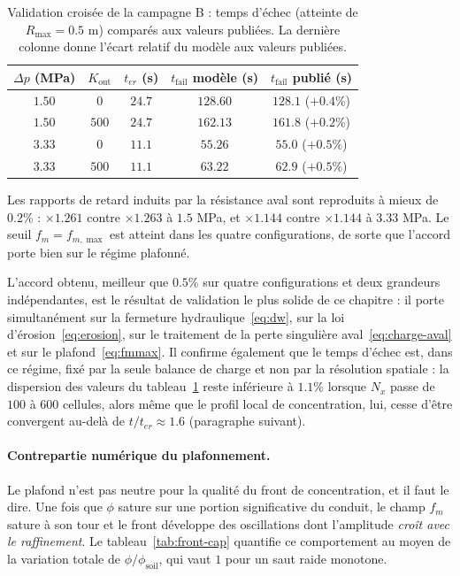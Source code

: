 \documentclass[11pt,a4paper]{report}
\newcommand{\phisol}{\phi_{\mathrm{soil}}}
\newcommand{\kout}{K_{\mathrm{out}}}
\newcommand{\ter}{{t_{er}}}
\begin{document}
\begin{table}[H]
\centering
\caption{Validation croisée de la campagne B : temps d'échec (atteinte de \(R_{\max} = 0.5\) m) comparés
aux valeurs publiées. La dernière colonne donne l'écart relatif du modèle aux valeurs publiées.}
\label{tab:validation-campagneB}
\small
\begin{tabular}{ccccc}
\toprule
\(\Delta p\) (MPa) & \(\kout\) & \(\ter\) (s) & \(t_{\mathrm{fail}}\) modèle (s) & \(t_{\mathrm{fail}}\) publié (s) \\
\midrule
\(1.50\) & \(0\)   & \(24.7\) & \(128.60\) & \(128.1\) \quad (\(+0.4\%\)) \\
\(1.50\) & \(500\) & \(24.7\) & \(162.13\) & \(161.8\) \quad (\(+0.2\%\)) \\
\(3.33\) & \(0\)   & \(11.1\) & \(55.26\)  & \(55.0\) \quad (\(+0.5\%\)) \\
\(3.33\) & \(500\) & \(11.1\) & \(63.22\)  & \(62.9\) \quad (\(+0.5\%\)) \\
\bottomrule
\end{tabular}
\begin{tablenotes}
\small
\item Les rapports de retard induits par la résistance aval sont reproduits à mieux de \(0.2\%\) :
\(\times1.261\) contre \(\times1.263\) à \(1.5\) MPa, et \(\times1.144\) contre \(\times1.144\) à
\(3.33\) MPa. Le seuil \(f_m = f_{m,\max}\) est atteint dans les quatre configurations, de sorte que
l'accord porte bien sur le régime plafonné.
\end{tablenotes}
\end{table}

L'accord obtenu, meilleur que \(0.5\%\) sur quatre configurations et deux grandeurs indépendantes, est le
résultat de validation le plus solide de ce chapitre : il porte simultanément sur la fermeture
hydraulique~\eqref{eq:dw}, sur la loi d'érosion~\eqref{eq:erosion}, sur le traitement de la perte
singulière aval~\eqref{eq:charge-aval} et sur le plafond~\eqref{eq:fmmax}. Il confirme également que le
temps d'échec est, dans ce régime, fixé par la seule balance de charge et non par la résolution spatiale :
la dispersion des valeurs du tableau~\ref{tab:validation-campagneB} reste inférieure à \(1.1\%\) lorsque
\(N_x\) passe de \(100\) à \(600\) cellules, alors même que le profil local de concentration, lui, cesse
d'être convergent au-delà de \(t/\ter \approx 1.6\) (paragraphe suivant).

\paragraph{Contrepartie numérique du plafonnement.} Le plafond n'est pas neutre pour la qualité du
front de concentration, et il faut le dire. Une fois que \(\phi\) sature sur une portion significative du
conduit, le champ \(f_m\) sature à son tour et le front développe des oscillations dont l'amplitude
\emph{croît avec le raffinement}. Le tableau~\ref{tab:front-cap} quantifie ce comportement au moyen de la
variation totale de \(\phi/\phisol\), qui vaut \(1\) pour un saut raide monotone.
\end{document}

